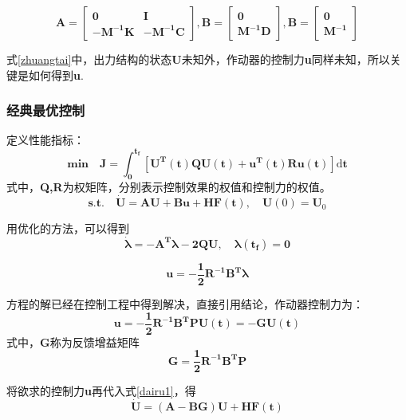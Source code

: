 \begin{equation}
\mathbf{
A=\left[
\begin{array}{cc}
0 & I \\
-M^{-1}K & -M^{-1}C
\end{array}
\right],
B=\left[
\begin{array}{c}
0 \\
M^{-1}D
\end{array}
\right],
B=\left[
\begin{array}{c}
0 \\
M^{-1}
\end{array}
\right]
}
\end{equation}

式\eqref{zhuangtai}中，出力结构的状态\textbf{U}未知外，作动器的控制力\textbf{u}同样未知，所以关键是如何得到\textbf{u}.

\subsubsection{经典最优控制}
定义性能指标：
\begin{equation}
\mathbf{min\quad J=\int^{t_f}_0\left[U^T(t)QU(t)+u^T(t)Ru(t)\right]\mathrm{d}t}
\end{equation}
式中，\textbf{Q,R}为权矩阵，分别表示控制效果的权值和控制力的权值。
\begin{equation}
\mathbf{s.t.\quad} \dot{\mathbf{U}}=\mathbf{AU+Bu+HF(t)},\quad \mathbf{U}(0)=\mathbf{U}_0\label{dairu1}
\end{equation}

用优化的方法，可以得到
\begin{equation}
\dot{\mathbf{\lambda}}=\mathbf{-A^T\lambda-2QU,\quad \lambda(t_f)=0}
\end{equation}

\begin{equation}
\mathbf{u=-\frac{1}{2}R^{-1}B^T\lambda}
\end{equation}

方程的解已经在控制工程中得到解决，直接引用结论，作动器控制力为：
\begin{equation}
\mathbf{u=-\frac{1}{2}R^{-1}B^TPU(t)=-GU(t)} \label{konghzhili}
\end{equation}
式中，\textbf{G}称为反馈增益矩阵
\begin{equation}
\mathbf{G=\frac{1}{2}R^{-1}B^TP} \label{fankui}
\end{equation}

将欲求的控制力\textbf{u}再代入式\eqref{dairu1}，得
\begin{equation}
\dot{\mathbf{U}}=\mathbf{(A-BG)U+HF(t)}  \label{xianxingjiegou}
\end{equation}

